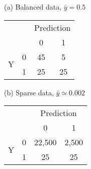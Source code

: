 \documentclass[tightpage]{standalone}
\begin{document}
\begin{varwidth}{\linewidth}

\begin{table}
\parbox{.45\linewidth}{
\centering
(a) Balanced data, $\bar{y}=0.5$ 
\vspace*{0.2cm}

\begin{tabular}{lc|c|c|}
\multicolumn{2}{c}{} & \multicolumn{2}{c}{Prediction} \\
\multicolumn{2}{c}{} & \multicolumn{1}{c}{0} & \multicolumn{1}{c}{1} \\ \cline{3-4}
\multirow{2}{*}{Y} & 0 & 45 & 5 \\ \cline{3-4}
& 1 & 25 & 25 \\ \cline{3-4}
\end{tabular} 
\vspace*{0.2cm}
}
\hfill
\parbox{.45\linewidth}{
\centering
(b) Sparse data, $\bar{y}\simeq0.002$
\vspace*{0.2cm}

\begin{tabular}{lc|c|c|}
\multicolumn{2}{c}{} & \multicolumn{2}{c}{Prediction} \\
\multicolumn{2}{c}{} & \multicolumn{1}{c}{0} & \multicolumn{1}{c}{1} \\ \cline{3-4}
\multirow{2}{*}{Y} & 0 & 22,500 & 2,500 \\ \cline{3-4}
& 1 & 25 & 25 \\ \cline{3-4}
\end{tabular}
\vspace*{0.2cm}
}
\end{table}

\end{varwidth}
\end{document}
